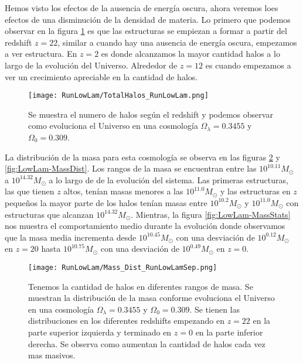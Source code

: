Hemos visto los efectos de la ausencia de energía oscura, ahora veremos loes efectos de una disminución de la densidad de materia. Lo primero que podemos observar en la figura \ref{fig:LowLam_TotalHalos} es que las estructuras se empiezan a formar a partir del redshift $z=22$, similar a cuando hay una ausencia de energía oscura, empezamos a ver estructura. En $z= 2$ es donde alcanzamos la mayor cantidad halos a lo largo de la evolución del Universo. Alrededor de $z = 12$ es cuando empezamos a ver un crecimiento apreciable en la cantidad de halos.

\begin{figure}[H]
    \centering
    \texttt{[image: RunLowLam/TotalHalos\_RunLowLam.png]}
    \caption[Evolución del número de halos en un Universo $\Omega_\lambda = 0.3455$, $\Omega_0 = 0.309$]{\footnotesize Se muestra el numero de halos según el redshift y podemos observar como evoluciona el Universo en una cosmología $\Omega_\lambda = 0.3455 $ y $\Omega_0 = 0.309$.}
    \label{fig:LowLam_TotalHalos}
\end{figure}

La distribución de la masa para esta cosmología se observa en las figuras \ref{fig:LowLam-MassDistSep} y \ref{fig:LowLam-MassDist}. Los rangos de la masa se encuentran entre las $10^{10.11}M_\odot$ a $10^{14.32}M_\odot$ a lo largo de de la evolución del sistema. Las primeras estructuras, las que tienen $z$ altos, tenían masas menores a las $10^{11.0}M_\odot$ y las estructuras en $z$ pequeños la mayor parte de los halos tenían masas entre $10^{10.2}M_\odot$ y $10^{11.0}M_\odot$ con estructuras que alcanzan $10^{14.32}M_\odot$. Mientras, la figura \ref{fig:LowLam-MassStats} nos muestra el comportamiento medio durante la evolución donde observamos que la masa media incrementa desde $10^{10.45}M_\odot$ con una desviación de $10^{0.12}M_\odot$ en $z=20$ hasta $10^{10.75}M_\odot$ con una desviación de $10^{0.49}M_\odot$ en $z=0$.

\begin{figure}[H]
    \centering
    \texttt{[image: RunLowLam/Mass\_Dist\_RunLowLamSep.png]}
    \caption[Distribución de masa]{\footnotesize Tenemos la cantidad de halos en diferentes rangos de masa. Se muestran la distribución de la masa conforme evoluciona el Universo en una cosmología $\Omega_\lambda = 0.3455$ y $\Omega_0 = 0.309$. Se tienen las distribuciones en los diferentes redshifts empezando en $z=22$ en la parte superior izquierda y terminado en $z=0$ en la parte inferior derecha. Se observa como aumentan la cantidad de halos cada vez mas masivos.}
    \label{fig:LowLam-MassDistSep}
\end{figure}

